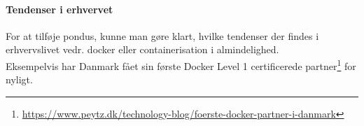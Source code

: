 \documentclass{article}
\begin{document}
\paragraph{Tendenser i erhvervet}
For at tilføje pondus, kunne man gøre klart, hvilke tendenser der findes i erhvervslivet vedr. docker eller containerisation i almindelighed.\\
Eksempelvis har Danmark fået sin første Docker Level 1 certificerede partner\footnote{\url{https://www.peytz.dk/technology-blog/foerste-docker-partner-i-danmark}} for nyligt.
\end{document}
